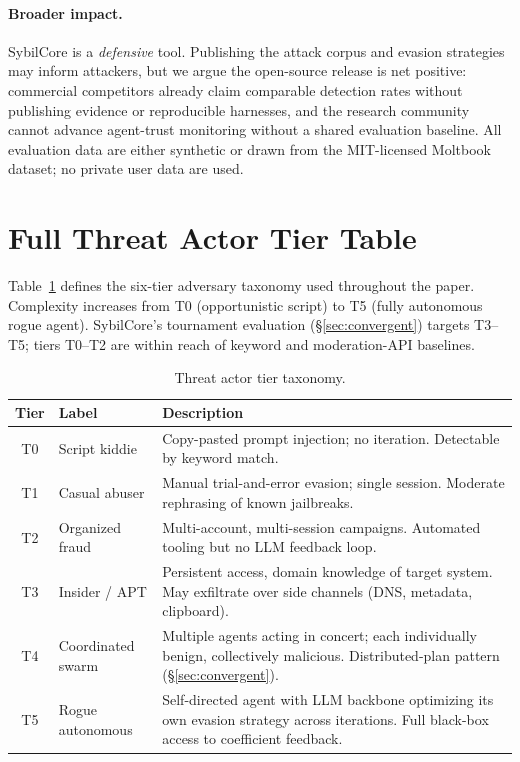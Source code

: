 \documentclass{article}
\begin{document}
\paragraph{Broader impact.}
SybilCore is a \emph{defensive} tool. Publishing the attack corpus
and evasion strategies may inform attackers, but we argue the
open-source release is net positive: commercial competitors already
claim comparable detection rates without publishing evidence or
reproducible harnesses, and the research community cannot advance
agent-trust monitoring without a shared evaluation baseline. All
evaluation data are either synthetic or drawn from the MIT-licensed
Moltbook dataset; no private user data are used.




\appendix


\section{Full Threat Actor Tier Table}
\label{app:tiers}

Table~\ref{tab:tiers} defines the six-tier adversary taxonomy used
throughout the paper. Complexity increases from T0 (opportunistic
script) to T5 (fully autonomous rogue agent). SybilCore's tournament
evaluation (\S\ref{sec:convergent}) targets T3--T5; tiers T0--T2 are
within reach of keyword and moderation-API baselines.

\begin{table}[h]
\centering
\small
\caption{Threat actor tier taxonomy.}
\label{tab:tiers}
\begin{tabular}{@{}clp{5.8cm}@{}}
\toprule
\textbf{Tier} & \textbf{Label} & \textbf{Description} \\
\midrule
T0 & Script kiddie & Copy-pasted prompt injection; no iteration.
     Detectable by keyword match. \\
T1 & Casual abuser & Manual trial-and-error evasion; single session.
     Moderate rephrasing of known jailbreaks. \\
T2 & Organized fraud & Multi-account, multi-session campaigns.
     Automated tooling but no LLM feedback loop. \\
T3 & Insider / APT & Persistent access, domain knowledge of target
     system. May exfiltrate over side channels
     (DNS, metadata, clipboard). \\
T4 & Coordinated swarm & Multiple agents acting in concert; each
     individually benign, collectively malicious.
     Distributed-plan pattern (\S\ref{sec:convergent}). \\
T5 & Rogue autonomous & Self-directed agent with LLM backbone
     optimizing its own evasion strategy across
     iterations. Full black-box access to
     coefficient feedback. \\
\bottomrule
\end{tabular}
\end{table}
\end{document}
